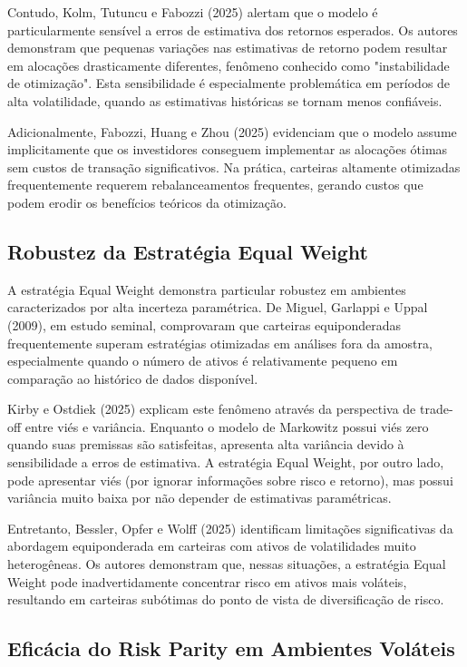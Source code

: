Contudo, Kolm, Tutuncu e Fabozzi (2025) alertam que o modelo é particularmente sensível a erros de estimativa dos retornos esperados. Os autores demonstram que pequenas variações nas estimativas de retorno podem resultar em alocações drasticamente diferentes, fenômeno conhecido como "instabilidade de otimização". Esta sensibilidade é especialmente problemática em períodos de alta volatilidade, quando as estimativas históricas se tornam menos confiáveis.

Adicionalmente, Fabozzi, Huang e Zhou (2025) evidenciam que o modelo assume implicitamente que os investidores conseguem implementar as alocações ótimas sem custos de transação significativos. Na prática, carteiras altamente otimizadas frequentemente requerem rebalanceamentos frequentes, gerando custos que podem erodir os benefícios teóricos da otimização.

\subsection{Robustez da Estratégia Equal Weight}

A estratégia Equal Weight demonstra particular robustez em ambientes caracterizados por alta incerteza paramétrica. De Miguel, Garlappi e Uppal (2009), em estudo seminal, comprovaram que carteiras equiponderadas frequentemente superam estratégias otimizadas em análises fora da amostra, especialmente quando o número de ativos é relativamente pequeno em comparação ao histórico de dados disponível.

Kirby e Ostdiek (2025) explicam este fenômeno através da perspectiva de trade-off entre viés e variância. Enquanto o modelo de Markowitz possui viés zero quando suas premissas são satisfeitas, apresenta alta variância devido à sensibilidade a erros de estimativa. A estratégia Equal Weight, por outro lado, pode apresentar viés (por ignorar informações sobre risco e retorno), mas possui variância muito baixa por não depender de estimativas paramétricas.

Entretanto, Bessler, Opfer e Wolff (2025) identificam limitações significativas da abordagem equiponderada em carteiras com ativos de volatilidades muito heterogêneas. Os autores demonstram que, nessas situações, a estratégia Equal Weight pode inadvertidamente concentrar risco em ativos mais voláteis, resultando em carteiras subótimas do ponto de vista de diversificação de risco.

\subsection{Eficácia do Risk Parity em Ambientes Voláteis}

